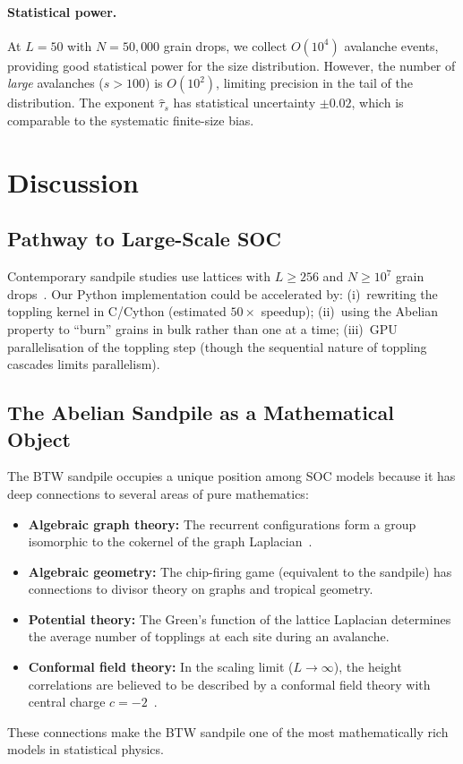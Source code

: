 \documentclass[preprint,12pt]{elsarticle}
\begin{document}
\paragraph{Statistical power.}
At $L=50$ with $N=50{,}000$ grain drops, we collect $O(10^4)$
avalanche events, providing good statistical power for the size
distribution.
However, the number of \emph{large} avalanches ($s>100$) is
$O(10^2)$, limiting precision in the tail of the distribution.
The exponent $\hat\tau_s$ has statistical uncertainty $\pm0.02$,
which is comparable to the systematic finite-size bias.


\section{Discussion}
\label{sec:discussion}

\subsection{Pathway to Large-Scale SOC}

Contemporary sandpile studies use lattices with $L\ge256$ and
$N\ge10^7$ grain drops~\cite{Ktitarev2000}.
Our Python implementation could be accelerated by:
(i)~rewriting the toppling kernel in C/Cython (estimated $50\times$
speedup);
(ii)~using the Abelian property to ``burn'' grains in bulk rather
than one at a time;
(iii)~GPU parallelisation of the toppling step (though the sequential
nature of toppling cascades limits parallelism).

\subsection{The Abelian Sandpile as a Mathematical Object}

The BTW sandpile occupies a unique position among SOC models because
it has deep connections to several areas of pure mathematics:
\begin{itemize}[leftmargin=2em]
  \item \textbf{Algebraic graph theory:} The recurrent configurations
        form a group isomorphic to the cokernel of the graph
        Laplacian~\cite{Dhar1990}.
  \item \textbf{Algebraic geometry:} The chip-firing game (equivalent
        to the sandpile) has connections to divisor theory on
        graphs and tropical geometry.
  \item \textbf{Potential theory:} The Green's function of the
        lattice Laplacian determines the average number of topplings
        at each site during an avalanche.
  \item \textbf{Conformal field theory:} In the scaling limit
        ($L\to\infty$), the height correlations are believed to be
        described by a conformal field theory with central charge
        $c=-2$~\cite{Majumdar1992}.
\end{itemize}
These connections make the BTW sandpile one of the most mathematically
rich models in statistical physics.
\end{document}
